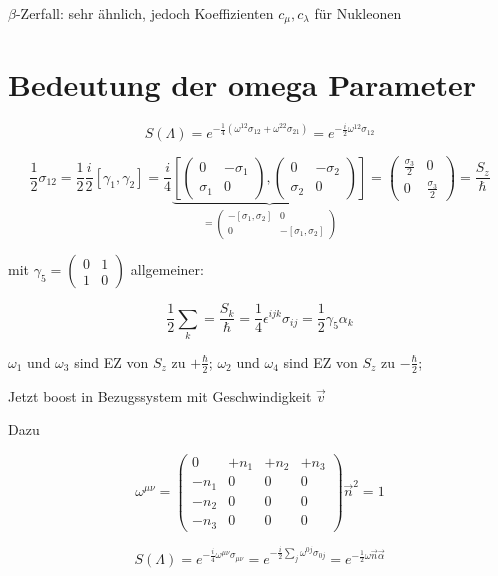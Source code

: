 \(\beta\)-Zerfall: sehr ähnlich, jedoch Koeffizienten \(c_\mu,c_\lambda\) für Nukleonen


\section{Bedeutung der omega Parameter}

\[S(\Lambda) = e^{-\frac{1}{4}(\omega^{12}\sigma_{12}+\omega^{22}\sigma_{21})}= e^{-\frac{i}{2}\omega^{12}\sigma_{12}}\]

\[\frac{1}{2}\sigma_{12} = \frac{1}{2}\frac{i}{2}[\gamma_1,\gamma_2] = \frac{i}{4}\underbrace{\left[ \begin{pmatrix} 0&-\sigma_1\\   \sigma_1&0 \end{pmatrix}, \begin{pmatrix} 0&-\sigma_2\\   \sigma_2&0 \end{pmatrix} \right]}_{=  \begin{pmatrix} -[\sigma_1,\sigma_2]&0\\  0&- [\sigma_1,\sigma_2] \end{pmatrix}  } =  \begin{pmatrix} \frac{\sigma_3}{2}&0\\0& \frac{\sigma_3}{2} \end{pmatrix} = \frac{S_z}{\hbar} \]


mit \(\gamma_5 = \begin{pmatrix} 0&1\\   1&0 \end{pmatrix} \) allgemeiner:

\[\frac{1}{2}\sum_k = \frac{S_k}{\hbar} = \frac{1}{4} \epsilon^{ijk}\sigma_{ij} = \frac{1}{2} \gamma_5\alpha_k\]

\(\omega_1\) und \(\omega_3\) sind EZ von \(S_z\) zu \(+\frac{\hbar}{2}\); \(\omega_2\) und \(\omega_4\) sind EZ von \(S_z\) zu \(-\frac{\hbar}{2}\);

Jetzt boost in Bezugssystem mit Geschwindigkeit \(\vec v\)

Dazu

\[\omega^{\mu\nu}   =\begin{pmatrix} 0&+n_1&+n_2&+n_3\\  -n_1&0&0&0\\   -n_2&0&0&0\\  -n_3&0&0&0 \end{pmatrix}\vec n^2 = 1 \]

\[ S(\Lambda) = e^{-\frac{i}{4}\omega^{\mu\nu}\sigma_{\mu\nu}}  = e^{-\frac{i}{2}\sum_j\omega^{0j}\sigma_{0j}} = e^{-\frac{1}{2}\omega \vec n\vec \alpha}  \]

